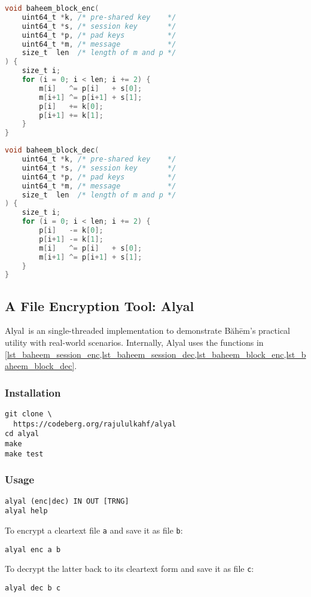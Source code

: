 \documentclass[twocolumn,hidelinks]{article}
\newcommand{\baheem}{Băhēm}
\newcommand{\alyal}{Alyal}
\begin{document}
\begin{lstlisting}[language=C, caption=Block encryption function example.,
                   label=lst_baheem_block_enc]
void baheem_block_enc(
    uint64_t *k, /* pre-shared key    */
    uint64_t *s, /* session key       */
    uint64_t *p, /* pad keys          */
    uint64_t *m, /* message           */
    size_t  len  /* length of m and p */
) {
    size_t i;
    for (i = 0; i < len; i += 2) {
        m[i]   ^= p[i]   + s[0];
        m[i+1] ^= p[i+1] + s[1];
        p[i]   += k[0];
        p[i+1] += k[1];
    }
}
\end{lstlisting}

\begin{lstlisting}[language=C, caption=Block decryption function example.,
                   label=lst_baheem_block_dec]
void baheem_block_dec(
    uint64_t *k, /* pre-shared key    */
    uint64_t *s, /* session key       */
    uint64_t *p, /* pad keys          */
    uint64_t *m, /* message           */
    size_t  len  /* length of m and p */
) {
    size_t i;
    for (i = 0; i < len; i += 2) {
        p[i]   -= k[0];
        p[i+1] -= k[1];
        m[i]   ^= p[i]   + s[0];
        m[i+1] ^= p[i+1] + s[1];
    }
}
\end{lstlisting}

\subsection{A File Encryption Tool: Alyal}
\alyal\ is an single-threaded implementation to demonstrate \baheem's
practical utility with real-world scenarios.  Internally, Alyal uses the
functions in
\cref{lst_baheem_session_enc,lst_baheem_session_dec,lst_baheem_block_enc,lst_baheem_block_dec}.

\subsubsection{Installation}
\begin{verbatim}
git clone \
  https://codeberg.org/rajululkahf/alyal
cd alyal
make
make test
\end{verbatim}

\subsubsection{Usage}

\begin{verbatim}
alyal (enc|dec) IN OUT [TRNG]
alyal help
\end{verbatim}

To encrypt a cleartext file \texttt{a} and save it as file \texttt{b}:
\begin{verbatim}
alyal enc a b
\end{verbatim}

To decrypt the latter back to its cleartext form and save it as file
\texttt{c}:
\begin{verbatim}
alyal dec b c
\end{verbatim}
\end{document}
